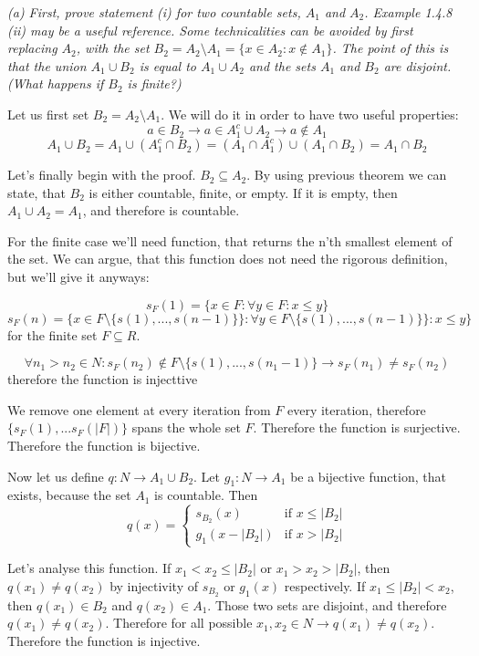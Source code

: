 \documentclass[11pt,oneside,titlepage]{book}
\begin{document}
\textit{(a) First, prove statement (i) for two countable sets, $A_1$ and $A_2$.
  Example 1.4.8 (ii) may be a useful reference. Some technicalities can be
  avoided by first replacing $A_2$, with the set $B_2 = A_2 \setminus A_1
  = \{x \in A_2: x \notin A_1\}$. The point of this is that the union
  $A_1 \cup B_2$ is equal to $A_1 \cup A_2$ and the sets $A_1$ and $B_2$ are
  disjoint. (What happens if $B_2$ is finite?)}

Let us first set $B_2 = A_2 \setminus A_1$. We will do it in order to have two
useful properties:
$$a \in B_2 \to a \in A_1^c \cup A_2 \to a \notin A_1$$
$$A_1 \cup B_2 = A_1 \cup (A_1^c \cap B_2) = (A_1 \cap A_1^c) \cup (A_1 \cap
B_2) = A_1 \cap B_2$$

Let's finally begin with the proof.  $B_2 \subseteq A_2$. By using
previous theorem we can state, that $B_2$ is either countable, finite, or
empty. If it is empty, then $A_1 \cup A_2 = A_1$, and therefore is countable.

For the finite case we'll need function, that returns the n'th smallest
element of the set. We can argue, that this function does not need the
rigorous definition, but we'll give it anyways:

$$s_F(1) = \{x \in F: \forall y \in F: x \leq y\}$$
$$s_F(n) = \{x \in F \setminus \{s(1),...,s(n - 1)\}\}:
\forall y \in F \setminus \{s(1),...,s(n - 1)\}\}: x \leq y\}$$
for the finite set $F \subseteq R$.

$$\forall n_1 > n_2 \in N: s_F(n_2) \notin F \setminus \{s(1),...,s(n_1 - 1)\}
\to s_F(n_1) \neq s_F(n_2)$$
therefore the function is injecttive

We remove one element at every iteration from $F$ every iteration, therefore
$\{s_F(1),...s_F(|F|)\}$ spans the whole set $F$. Therefore the function is
surjective. Therefore the function is bijective.

Now let us define $q: N \to A_1 \cup B_2$. Let $g_1: N \to A_1$ be a bijective
function, that exists, because the set $A_1$ is countable. Then 
\begin{equation}
  q(x)=
  \begin{cases}
    s_{B_2}(x) & \text{if } x \leq |B_2|\\
    g_1(x - |B_2|) & \text{if } x > |B_2|
  \end{cases}
\end{equation}

Let's analyse this function. If $x_1 < x_2 \leq |B_2|$ or $x_1 > x_2 > |B_2|$,
then $q(x_1) \neq q(x_2)$ by injectivity of $s_{B_2}$ or $g_1(x)$ respectively.
If $x_1 \leq |B_2| < x_2$, then $q(x_1) \in B_2$ and $q(x_2) \in A_1$. Those
two sets are disjoint, and therefore $q(x_1) \neq q(x_2)$. Therefore for
all possible $x_1,x_2 \in N \to q(x_1) \neq q(x_2)$. Therefore the function
is injective.
\end{document}
